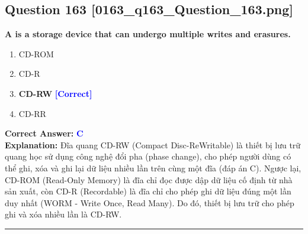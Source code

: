\documentclass[11pt,a4paper]{article}
\begin{document}
\begin{minipage}{\textwidth}
\subsection*{Question 163 \quad \footnotesize{[0163\_q163\_Question\_163.png]}}
\noindent \textbf{A is a storage device that can undergo multiple writes and erasures.}

\begin{enumerate}[label=\Alph*.]
    \item CD-ROM
    \item CD-R
    \item \textbf{CD-RW} \hfill \textcolor{blue}{\textbf{[Correct]}}
    \item CD-RR
\end{enumerate}

\noindent \textbf{Correct Answer:} \textcolor{blue}{\textbf{C}} \\[2pt]
\noindent \textbf{Explanation:} Đĩa quang CD-RW (Compact Disc-ReWritable) là thiết bị lưu trữ quang học sử dụng công nghệ đổi pha (phase change), cho phép người dùng có thể ghi, xóa và ghi lại dữ liệu nhiều lần trên cùng một đĩa (đáp án C). Ngược lại, CD-ROM (Read-Only Memory) là đĩa chỉ đọc được dập dữ liệu cố định từ nhà sản xuất, còn CD-R (Recordable) là đĩa chỉ cho phép ghi dữ liệu đúng một lần duy nhất (WORM - Write Once, Read Many). Do đó, thiết bị lưu trữ cho phép ghi và xóa nhiều lần là CD-RW.

\par\vspace{0.3cm}
\hrule
\vspace{0.3cm}
\end{minipage}
\end{document}
